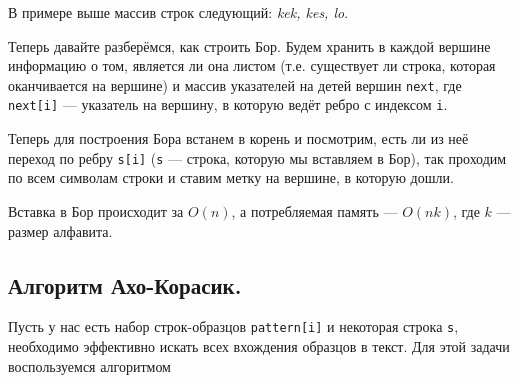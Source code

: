 В примере выше массив строк следующий:  \textit{kek, kes, lo}.

Теперь давайте разберёмся, как строить Бор. Будем хранить в каждой вершине информацию о том, является ли
она листом (т.е. существует ли строка, которая оканчивается на вершине) и массив указателей на детей вершин
\lstinline{next}, где \lstinline{next[i]} --- указатель на вершину, в которую ведёт ребро с индексом
\lstinline{i}.

Теперь для построения Бора встанем в корень и посмотрим, есть ли из неё переход по ребру \lstinline{s[i]}
(\lstinline{s} --- строка, которую мы вставляем в Бор), так проходим по всем символам строки и ставим
метку на вершине, в которую дошли.

\begin{remark}
        Вставка в Бор происходит за $O(n)$, а потребляемая память --- $O(nk)$, где  $k$ --- размер алфавита.
\end{remark}

\subsection{Алгоритм Ахо-Корасик.}

Пусть у нас есть набор строк-образцов \lstinline{pattern[i]} и некоторая строка \lstinline{s},
необходимо эффективно искать всех вхождения образцов в текст. Для этой задачи воспользуемся алгоритмом

